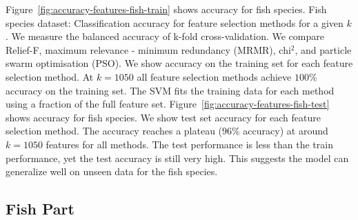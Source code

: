 \documentclass[runningheads]{llncs}
\begin{document}
Figure~\ref{fig:accuracy-features-fish-train} shows accuracy for fish species.
Fish species dataset: Classification accuracy for feature selection methods for a given $k$.
We measure the balanced accuracy of k-fold cross-validation.
We compare Relief-F, maximum relevance - minimum redundancy (MRMR), chi$^2$, and particle swarm optimisation (PSO).
We show accuracy on the training set for each feature selection method.
At $k=1050$ all feature selection methods achieve $100\%$ accuracy on the training set.
The SVM fits the training data for each method using a fraction of the full feature set.
Figure~\ref{fig:accuracy-features-fish-test} shows accuracy for fish species.
We show test set accuracy for each feature selection method.
The accuracy reaches a plateau ($96\%$ accuracy) at around $k=1050$ features for all methods.
The test performance is less than the train performance, yet the test accuracy is still very high.
This suggests the model can generalize well on unseen data for the fish species.

\subsection{Fish Part}
\end{document}
